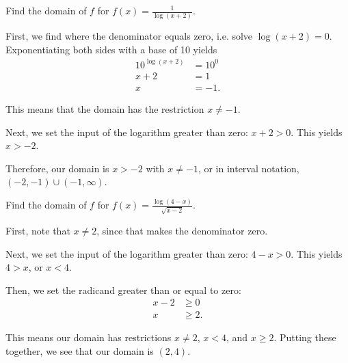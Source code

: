 \documentclass{ximera}
\begin{document}
\begin{example}
Find the domain of $f$ for $f(x) = \frac{1}{\log(x + 2)}$.
		\begin{explanation}
			\begin{expandable}
First, we find where the denominator equals zero, i.e. solve $\log(x + 2) = 0$. Exponentiating both sides with a base of 10 yields \begin{align*}10^{\log(x + 2)} & = 10^0 \\ x + 2 & = 1 \\ x & = -1. \end{align*}

This means that the domain has the restriction $x \ne -1$. 

Next, we set the input of the logarithm greater than zero: $x + 2 > 0$. This yields $x > -2$.

Therefore, our domain is $x > -2$ with $x \ne -1$, or in interval notation, $(-2, -1) \cup (-1, \infty)$. 
			\end{expandable}
		\end{explanation}
\end{example}
\begin{example}
Find the domain of $f$ for $f(x) = \frac{\log(4 - x)}{\sqrt{x - 2}}$.
		\begin{explanation}
			\begin{expandable}
First, note that $x \ne 2$, since that makes the denominator zero.

Next, we set the input of the logarithm greater than zero: $4 - x > 0$. This yields $4 > x$, or $x < 4$.

Then, we set the radicand greater than or equal to zero: \begin{align*}x - 2&\ge 0 \\ x & \ge 2. \end{align*}

This means our domain has restrictions $x \ne 2$, $x < 4$, and $x \ge 2$. Putting these together, we see that our domain is $(2, 4)$. 
			\end{expandable}
		\end{explanation}
\end{example}



\end{document}
